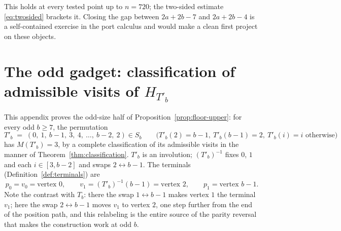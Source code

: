\documentclass[11pt]{article}
\theoremstyle{definition}
\newcommand{\inv}[1]{#1^{-1}}
\begin{document}
This holds at every tested point up to $n = 720$; the two-sided estimate
\eqref{eq:twosided} brackets it. Closing the gap between $2a + 2b - 7$ and
$2a + 2b - 4$ is a self-contained exercise in the port calculus and would make
a clean first project on these objects.

\appendix


\section{The odd gadget: classification of admissible visits of
\texorpdfstring{$H_{T'_b}$}{H\_\{T'\_b\}}}\label{app:oddb}

This appendix proves the odd-size half of Proposition~\ref{prop:floor-upper}: for
every odd $b \ge 7$, the permutation
\[
T'_b \;=\; (0,\ 1,\ b{-}1,\ 3,\ 4,\ \dots,\ b{-}2,\ 2) \in S_b
\qquad
\bigl(T'_b(2) = b-1,\ T'_b(b-1) = 2,\ T'_b(i) = i \text{ otherwise}\bigr)
\]
has $M(T'_b) = 3$, by a complete classification of its admissible visits in the manner
of Theorem~\ref{thm:classification}. $T'_b$ is an involution;
$\inv{(T'_b)}$ fixes $0$, $1$ and each $i \in [3, b-2]$ and swaps
$2 \leftrightarrow b-1$. The terminals (Definition~\ref{def:terminals}) are
\[
p_0 = v_0 = \text{vertex } 0, \qquad v_1 = \inv{(T'_b)}(b-1) = \text{vertex } 2,
\qquad p_1 = \text{vertex } b-1 .
\]
Note the contrast with $T_b$: there the swap $1 \leftrightarrow b-1$ makes vertex $1$
the terminal $v_1$; here the swap $2 \leftrightarrow b-1$ moves $v_1$ to vertex $2$,
one step further from the end of the position path, and this relabeling is the entire
source of the parity reversal that makes the construction work at odd $b$.
\end{document}
